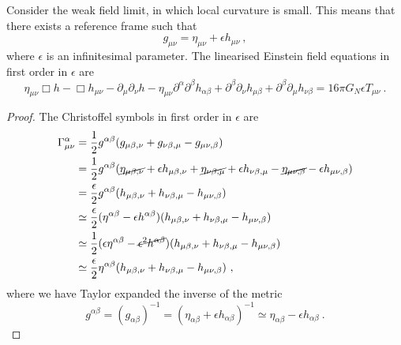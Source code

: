     Consider the weak field limit, in which local curvature is small. This means that there exists a reference frame such that
    \begin{equation*}
        g_{\mu\nu} = \eta_{\mu\nu} + \epsilon h_{\mu\nu} ~,
    \end{equation*}
    where $\epsilon$ is an infinitesimal parameter. The linearised Einstein field equations in first order in $\epsilon$ are 
    \begin{equation*}
        \eta_{\mu\nu} \Box h - \Box h_{\mu\nu} - \partial_\mu \partial_\nu h - \eta_{\mu\nu} \partial^\alpha \partial^\beta h_{\alpha\beta}  + \partial^\beta \partial_\nu h_{\mu\beta} + \partial^\beta \partial_\mu h_{\nu\beta} = 16 \pi G_N \epsilon T_{\mu\nu} ~.
    \end{equation*}
    \begin{proof}
        The Christoffel symbols in first order in $\epsilon$ are
        \begin{equation}\label{proof4}
        \begin{aligned}
            \Gamma^\alpha_{\mu\nu} & = \frac{1}{2} g^{\alpha\beta} (g_{\mu\beta, \nu} + g_{\nu\beta,\mu} - g_{\mu\nu,\beta}) \\ & = \frac{1}{2} g^{\alpha\beta} (\cancel{\eta_{\mu\beta, \nu}} + \epsilon h_{\mu\beta, \nu} + \cancel{\eta_{\nu\beta,\mu}} + \epsilon h_{\nu\beta,\mu} - \cancel{\eta_{\mu\nu,\beta} }- \epsilon h_{\mu\nu,\beta} ) \\ & = \frac{\epsilon}{2} g^{\alpha\beta} (h_{\mu\beta, \nu} + h_{\nu\beta,\mu} - h_{\mu\nu,\beta}) \\ & \simeq \frac{\epsilon}{2} (\eta^{\alpha\beta} - \epsilon h^{\alpha\beta}) (h_{\mu\beta, \nu} + h_{\nu\beta,\mu} - h_{\mu\nu,\beta}) \\ & \simeq \frac{1}{2} (\epsilon \eta^{\alpha\beta} - \cancel{\epsilon^2 h^{\alpha\beta}}) (h_{\mu\beta, \nu} + h_{\nu\beta,\mu} - h_{\mu\nu,\beta}) \\ & \simeq \frac{\epsilon}{2} \eta^{\alpha\beta} (h_{\mu\beta, \nu} + h_{\nu\beta,\mu} - h_{\mu\nu,\beta}) ~,
        \end{aligned}
        \end{equation}
        where we have Taylor expanded the inverse of the metric 
        \begin{equation*}
            g^{\alpha\beta} = (g_{\alpha\beta})^{-1} = (\eta_{\alpha\beta} + \epsilon h_{\alpha\beta})^{-1} \simeq \eta_{\alpha\beta} - \epsilon h_{\alpha\beta}  ~.
        \end{equation*}

\end{proof}
